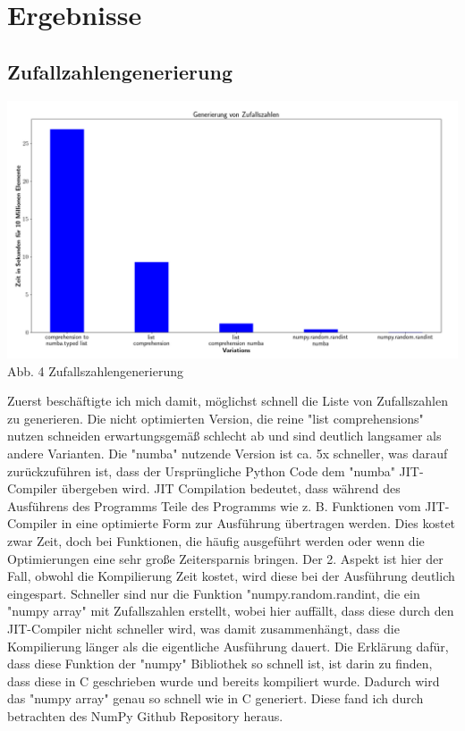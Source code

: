 \documentclass[12pt,a4paper]{article}
\begin{document}
\clearpage
\section{Ergebnisse}

\subsection{Zufallzahlengenerierung}

\begin{center}
    \hspace*{-1.5cm}\includegraphics[width=1.2\textwidth]{./diagramme/matplotlib/zufallszahlen.png}
    Abb. 4 Zufallszahlengenerierung
\end{center}

Zuerst beschäftigte ich mich damit, möglichst schnell die Liste von Zufallszahlen zu generieren.
Die nicht optimierten Version, die reine "list comprehensions" nutzen schneiden erwartungsgemäß schlecht ab
und sind deutlich langsamer als andere Varianten. Die "numba" nutzende Version ist ca. 5x schneller,
was darauf zurückzuführen ist, dass der Ursprüngliche Python Code dem "numba" JIT-Compiler übergeben wird.
JIT Compilation bedeutet, dass während des Ausführens des Programms Teile des Programms wie z. B. Funktionen
vom JIT-Compiler in eine optimierte Form zur Ausführung übertragen werden. Dies kostet zwar Zeit, doch bei
Funktionen, die häufig ausgeführt werden oder wenn die Optimierungen eine sehr große Zeitersparnis bringen.
Der 2. Aspekt ist hier der Fall, obwohl die Kompilierung Zeit kostet, wird diese bei der Ausführung deutlich eingespart.
Schneller sind nur die Funktion "numpy.random.randint, die ein "numpy array" mit Zufallszahlen erstellt,
wobei hier auffällt, dass diese durch den JIT-Compiler nicht schneller wird, was damit zusammenhängt, dass die Kompilierung
länger als die eigentliche Ausführung dauert. Die Erklärung dafür, dass diese Funktion der "numpy" Bibliothek
so schnell ist, ist darin zu finden, dass diese in C geschrieben wurde und bereits kompiliert wurde. Dadurch wird
das "numpy array" genau so schnell wie in C generiert. Diese fand ich durch betrachten des NumPy Github Repository heraus.
\end{document}

